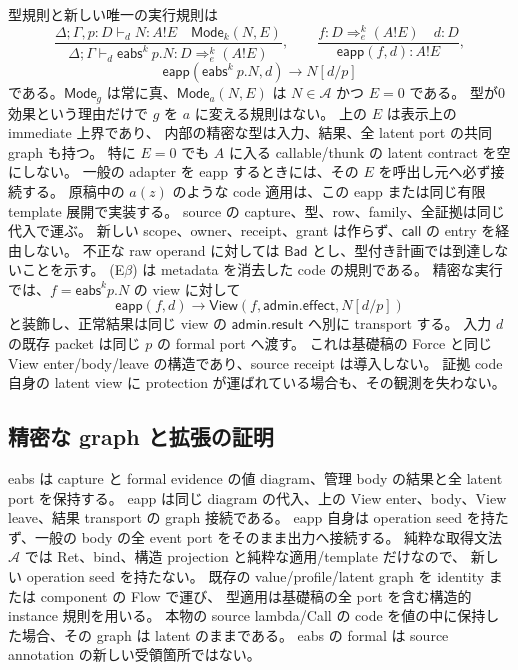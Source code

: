 \documentclass[11pt,a4paper]{article}
\newcommand{\Call}{\mathsf{call}}
\newcommand{\Ty}{\mathrel{\vdash_d}}
\begin{document}
型規則と新しい唯一の実行規則は
\[
 \frac{\Delta;\Gamma,p:D\Ty N:A!E\quad\mathsf{Mode}_k(N,E)}
      {\Delta;\Gamma\Ty\mathsf{eabs}^{k}\ p.N:D\Rightarrow_e^{k}(A!E)},
 \qquad
 \frac{f:D\Rightarrow_e^{k}(A!E)\quad d:D}{\mathsf{eapp}(f,d):A!E},
\]
\[
 \mathsf{eapp}(\mathsf{eabs}^{k}\ p.N,d)\longrightarrow N[d/p]
 \tag{E$\beta$}
\]
である。\(\mathsf{Mode}_g\) は常に真、\(\mathsf{Mode}_a(N,E)\) は
\(N\in\mathcal A\) かつ \(E=0\) である。
型が0効果という理由だけで \(g\) を \(a\) に変える規則はない。
上の \(E\) は表示上の immediate 上界であり、
内部の精密な型は入力、結果、全 latent port の共同 graph も持つ。
特に \(E=0\) でも \(A\) に入る callable/thunk の latent contract を空にしない。
一般の adapter を eapp するときには、その \(E\) を呼出し元へ必ず接続する。
原稿中の \(a(z)\) のような code 適用は、この eapp または同じ有限 template 展開で実装する。
source の capture、型、row、family、全証拠は同じ代入で運ぶ。
新しい scope、owner、receipt、grant は作らず、\(\Call\) の entry を経由しない。
不正な raw operand に対しては \(\mathsf{Bad}\) とし、型付き計画では到達しないことを示す。
(E\(\beta\)) は metadata を消去した code の規則である。
精密な実行では、\(f=\mathsf{eabs}^k p.N\) の view に対して
\[
 \mathsf{eapp}(f,d)\longrightarrow
 \mathsf{View}(f,\mathsf{admin.effect},N[d/p])
\]
と装飾し、正常結果は同じ view の \(\mathsf{admin.result}\) へ別に transport する。
入力 \(d\) の既存 packet は同じ \(p\) の formal port へ渡す。
これは基礎稿の Force と同じ View enter/body/leave の構造であり、source receipt は導入しない。
証拠 code 自身の latent view に protection が運ばれている場合も、その観測を失わない。

\subsection{精密な graph と拡張の証明}

eabs は capture と formal evidence の値 diagram、管理 body の結果と全 latent port を保持する。
eapp は同じ diagram の代入、上の View enter、body、View leave、結果 transport の graph 接続である。
eapp 自身は operation seed を持たず、一般の body の全 event port をそのまま出力へ接続する。
純粋な取得文法 \(\mathcal A\) では Ret、bind、構造 projection と純粋な適用/template だけなので、
新しい operation seed を持たない。
既存の value/profile/latent graph を identity または component の Flow で運び、
型適用は基礎稿の全 port を含む構造的 instance 規則を用いる。
本物の source lambda/Call の code を値の中に保持した場合、その graph は latent のままである。
eabs の formal は source annotation の新しい受領箇所ではない。
\end{document}
